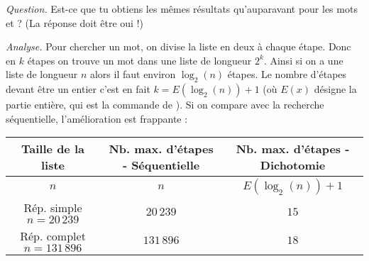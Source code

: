 \documentclass[11pt,class=report,crop=false]{standalone}
\begin{document}
\begin{activite}
\begin{enumerate}
   
  \medskip 
     
  \emph{Question.} Est-ce que tu obtiens les mêmes résultats qu'auparavant pour les mots  et  ? (La réponse doit être \og{}oui\fg{} !)
     
  \smallskip 
  
  \emph{Analyse.} Pour chercher un mot, on divise la liste en deux à chaque étape. Donc en $k$ étapes on trouve un mot dans une liste de longueur $2^k$. Ainsi si on a une liste de longueur $n$ alors il faut environ $\log_2(n)$ étapes. Le nombre d'étapes devant être un entier c'est en fait $k = E(\log_2(n))+1$ (où $E(x)$ désigne la partie entière, qui est la commande  de \Python).
  Si on compare avec la recherche séquentielle, l'amélioration est frappante :
\begin{center}
\couleurnb{}{\small}
\begin{tabular}{|c|c|c|}\hline
Taille de la liste & Nb. max. d'étapes - Séquentielle & Nb. max. d'étapes - Dichotomie \\ \hline\hline
$n$ & $n$ & $E(\log_2(n))+1$ \\ \hline
Rép. simple $n=20\,239$ & $20\,239$ & $15$ \\ \hline
Rép. complet $n = 131\,896$ & $131\,896$ & $18$ \\\hline
\end{tabular}
\end{center}    

\end{enumerate}

\end{activite}


\end{document}
